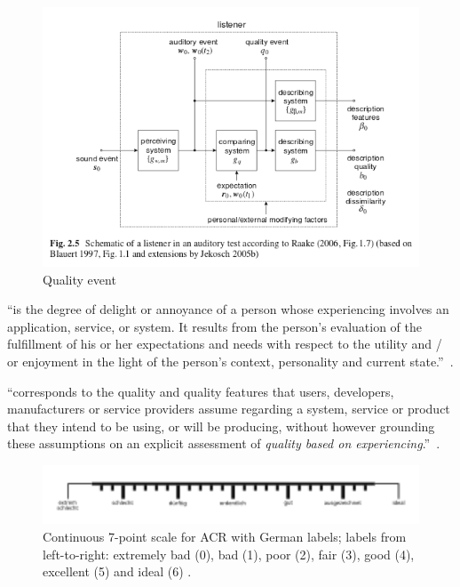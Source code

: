 \begin{figure}
	\includegraphics[width=1\textwidth]{fig/quality-event}
	\caption{Quality event}
	\label{img:chap02:quality-event}
\end{figure}


\begin{definition}
``is the degree of delight or annoyance of a person whose experiencing involves an application, service, or system. It results from the person’s evaluation of the fulfillment of his or her expectations and needs with respect to the utility and / or enjoyment in the light of the person’s context, personality and current state.''~\citep[p. 21]{moller_quality_2014}.
\end{definition}

\begin{definition}
``corresponds to the quality and quality features that users, developers, manufacturers or  service  providers assume regarding a  system, service or product that they intend to be using, or will be producing, without however grounding these assumptions on an explicit assessment of \textit{quality based on experiencing}.''~\citep[p. 20]{moller_quality_2014}.
\end{definition}


\begin{figure}
	\includegraphics[width=1\textwidth]{fig/quality7pt_scale}
	\caption{Continuous 7-point scale for \ac{ACR} with German labels; labels from left-to-right: extremely bad (0), bad (1), poor (2), fair (3), good (4), excellent (5) and ideal (6) \citep{itu-t_p.805:_2007}.}
	\label{img:chap02:qualityScale}
\end{figure}

